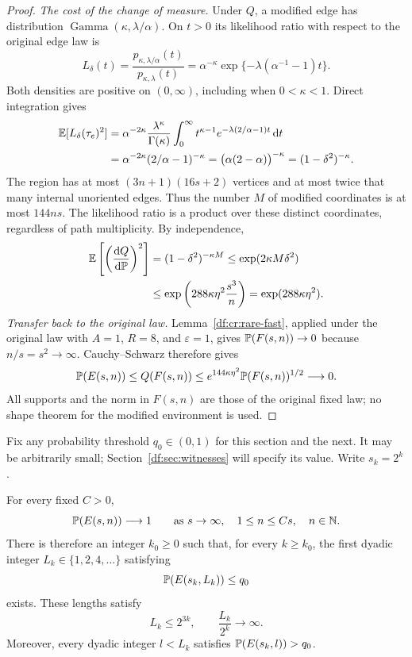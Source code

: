 \begin{proof}
\emph{The cost of the change of measure.}
Under $Q$, a modified edge has distribution
$\operatorname{Gamma}(\kappa,\lambda/\alpha)$. On $t>0$ its likelihood
ratio with respect to the original edge law is
\[
 L_\delta(t)
 =\frac{p_{\kappa,\lambda/\alpha}(t)}{p_{\kappa,\lambda}(t)}
 =\alpha^{-\kappa}
    \exp\{-\lambda(\alpha^{-1}-1)t\}.
\]
Both densities are positive on $(0,\infty)$, including when
$0<\kappa<1$. Direct integration gives
\[
 \begin{split}
 \mathbb E[L_\delta(\tau_e)^2]
 &=\alpha^{-2\kappa}\frac{\lambda^\kappa}{\Gamma(\kappa)}
   \int_0^\infty t^{\kappa-1}
     e^{-\lambda(2/\alpha-1)t}\,\mathrm d t\\
 &=\alpha^{-2\kappa}(2/\alpha-1)^{-\kappa}
   =\bigl(\alpha(2-\alpha)\bigr)^{-\kappa}
   =(1-\delta^2)^{-\kappa}.
 \end{split}
\]
The region has at most $(3n+1)(16s+2)$ vertices and at most twice that
many internal unoriented edges. Thus the number $M$ of modified
coordinates is at most $144ns$. The likelihood ratio is a product
over these distinct coordinates, regardless of path multiplicity.
By independence,
\[
 \begin{split}
 \mathbb E\left[\left(\frac{\mathrm d Q}{\mathrm d\mathbb P}\right)^2\right]
 &=(1-\delta^2)^{-\kappa M}
 \le \exp(2\kappa M\delta^2)\\
 &\le \exp\left(288\kappa\eta^2\frac{s^3}{n}\right)
 =\exp(288\kappa\eta^2).
 \end{split}
\]
\emph{Transfer back to the original law.}
Lemma~\ref{df:cr:rare-fast}, applied under the original law with $A=1$,
$R=8$, and $\varepsilon=1$, gives $\mathbb P(F(s,n))\to0$ because $n/s=s^2\to\infty$.
Cauchy--Schwarz therefore gives
\[
 \mathbb P(E(s,n))\le Q(F(s,n))
 \le e^{144\kappa\eta^2}\mathbb P(F(s,n))^{1/2}\longrightarrow0.
\]
All supports and the norm in $F(s,n)$ are those of the original fixed
law; no shape theorem for the modified environment is used.
\end{proof}

Fix any probability threshold $q_0\in(0,1)$ for this section and the
next. It may be arbitrarily small; Section~\ref{df:sec:witnesses}
will specify its value. Write $s_k=2^k$.

\begin{lemma}\label{df:gr:characteristic-lengths}
For every fixed $C>0$,
\begin{equation}\label{df:eq:gr-short-crossings}
 \mathbb P(E(s,n))\longrightarrow1
 \qquad\text{as }s\to\infty,\quad 1\leq n\leq Cs,\quad n\in\mathbb N.
\end{equation}
There is therefore an integer $k_0\geq0$ such that, for every $k\geq k_0$,
the first dyadic integer $L_k\in\{1,2,4,\ldots\}$ satisfying
\begin{equation}\label{df:eq:gr-characteristic-threshold}
 \mathbb P(E(s_k,L_k))\leq q_0
\end{equation}
exists. These lengths satisfy
\begin{equation}\label{df:eq:gr-characteristic-bounds}
 L_k\leq2^{3k},\qquad \frac{L_k}{2^k}\longrightarrow\infty.
\end{equation}
Moreover, every dyadic integer $l<L_k$ satisfies
$\mathbb P(E(s_k,l))>q_0$.
\end{lemma}

